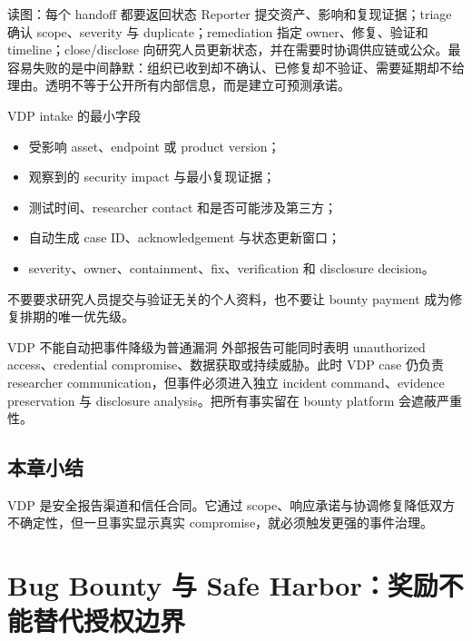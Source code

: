 \documentclass[a4paper]{article}
\begin{document}
\begin{knowledgebox}{读图：每个 handoff 都要返回状态}
Reporter 提交资产、影响和复现证据；triage 确认 scope、severity 与 duplicate；remediation 指定 owner、修复、验证和 timeline；close/disclose 向研究人员更新状态，并在需要时协调供应链或公众。最容易失败的是中间静默：组织已收到却不确认、已修复却不验证、需要延期却不给理由。透明不等于公开所有内部信息，而是建立可预测承诺。
\end{knowledgebox}

\begin{importantbox}{VDP intake 的最小字段}
\begin{itemize}
  \item 受影响 asset、endpoint 或 product version；
  \item 观察到的 security impact 与最小复现证据；
  \item 测试时间、researcher contact 和是否可能涉及第三方；
  \item 自动生成 case ID、acknowledgement 与状态更新窗口；
  \item severity、owner、containment、fix、verification 和 disclosure decision。
\end{itemize}
不要要求研究人员提交与验证无关的个人资料，也不要让 bounty payment 成为修复排期的唯一优先级。
\end{importantbox}


\begin{warningbox}{VDP 不能自动把事件降级为普通漏洞}
外部报告可能同时表明 unauthorized access、credential compromise、数据获取或持续威胁。此时 VDP case 仍负责 researcher communication，但事件必须进入独立 incident command、evidence preservation 与 disclosure analysis。把所有事实留在 bounty platform 会遮蔽严重性。
\end{warningbox}

\subsection{本章小结}

VDP 是安全报告渠道和信任合同。它通过 scope、响应承诺与协调修复降低双方不确定性，但一旦事实显示真实 compromise，就必须触发更强的事件治理。

\section{Bug Bounty 与 Safe Harbor：奖励不能替代授权边界}
\end{document}
